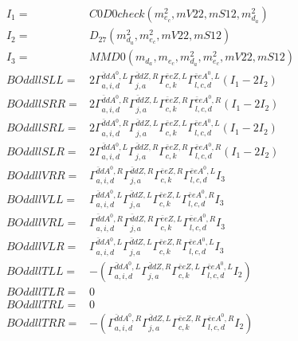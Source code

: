 \documentclass[A4,landscape]{article}
\begin{document}
\begin{align} 
I_1 = & C0D0check(m^2_{e_{{c}}}, mV22, mS12, m^2_{d_{{a}}}) \\ 
I_2 = & D_{27}(m^2_{d_{{a}}}, m^2_{e_{{c}}}, mV22, mS12) \\ 
I_3 = & MMD0(m_{d_{{a}}}, m_{e_{{c}}}, m^2_{d_{{a}}}, m^2_{e_{{c}}}, mV22, mS12) \\ 
  BOddllSLL= & 2  \Gamma^{\bar{d}d A^0 ,L}_{a, i, d} \Gamma^{\bar{d}d Z ,R}_{j, a} \Gamma^{\bar{e}e Z ,L}_{c, k} \Gamma^{\bar{e}e A^0 ,L}_{l, c, d} (I_1 - 2 I_2) \\ 
  BOddllSRR= & 2  \Gamma^{\bar{d}d A^0 ,R}_{a, i, d} \Gamma^{\bar{d}d Z ,L}_{j, a} \Gamma^{\bar{e}e Z ,R}_{c, k} \Gamma^{\bar{e}e A^0 ,R}_{l, c, d} (I_1 - 2 I_2) \\ 
  BOddllSRL= & 2  \Gamma^{\bar{d}d A^0 ,R}_{a, i, d} \Gamma^{\bar{d}d Z ,L}_{j, a} \Gamma^{\bar{e}e Z ,L}_{c, k} \Gamma^{\bar{e}e A^0 ,L}_{l, c, d} (I_1 - 2 I_2) \\ 
  BOddllSLR= & 2  \Gamma^{\bar{d}d A^0 ,L}_{a, i, d} \Gamma^{\bar{d}d Z ,R}_{j, a} \Gamma^{\bar{e}e Z ,R}_{c, k} \Gamma^{\bar{e}e A^0 ,R}_{l, c, d} (I_1 - 2 I_2) \\ 
  BOddllVRR= &  \Gamma^{\bar{d}d A^0 ,R}_{a, i, d} \Gamma^{\bar{d}d Z ,R}_{j, a} \Gamma^{\bar{e}e Z ,R}_{c, k} \Gamma^{\bar{e}e A^0 ,L}_{l, c, d} I_3 \\ 
  BOddllVLL= &  \Gamma^{\bar{d}d A^0 ,L}_{a, i, d} \Gamma^{\bar{d}d Z ,L}_{j, a} \Gamma^{\bar{e}e Z ,L}_{c, k} \Gamma^{\bar{e}e A^0 ,R}_{l, c, d} I_3 \\ 
  BOddllVRL= &  \Gamma^{\bar{d}d A^0 ,R}_{a, i, d} \Gamma^{\bar{d}d Z ,R}_{j, a} \Gamma^{\bar{e}e Z ,L}_{c, k} \Gamma^{\bar{e}e A^0 ,R}_{l, c, d} I_3 \\ 
  BOddllVLR= &  \Gamma^{\bar{d}d A^0 ,L}_{a, i, d} \Gamma^{\bar{d}d Z ,L}_{j, a} \Gamma^{\bar{e}e Z ,R}_{c, k} \Gamma^{\bar{e}e A^0 ,L}_{l, c, d} I_3 \\ 
  BOddllTLL= & -( \Gamma^{\bar{d}d A^0 ,L}_{a, i, d} \Gamma^{\bar{d}d Z ,R}_{j, a} \Gamma^{\bar{e}e Z ,L}_{c, k} \Gamma^{\bar{e}e A^0 ,L}_{l, c, d} I_2) \\ 
  BOddllTLR= & 0 \\ 
  BOddllTRL= & 0 \\ 
  BOddllTRR= & -( \Gamma^{\bar{d}d A^0 ,R}_{a, i, d} \Gamma^{\bar{d}d Z ,L}_{j, a} \Gamma^{\bar{e}e Z ,R}_{c, k} \Gamma^{\bar{e}e A^0 ,R}_{l, c, d} I_2) \\ 
\end{align} 
\end{document}
